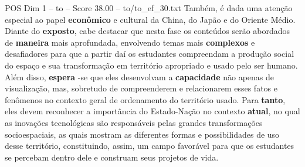 \begin{textsample}{POS Dim 1 – to – Score 38.00 – to/to\_ef\_30.txt}
Também, é dada uma atenção especial ao papel \textbf{econômico} e cultural da China, do Japão e do Oriente Médio.
Diante do \textbf{exposto}, cabe destacar que nesta fase os conteúdos serão abordados de \textbf{maneira} mais aprofundada, envolvendo temas mais \textbf{complexos} e desafiadores para que a partir daí os estudantes compreendam a produção social do espaço e sua transformação em território apropriado e usado pelo ser humano.
Além disso, \textbf{espera} -se que eles desenvolvam a \textbf{capacidade} não apenas de visualização, mas, sobretudo de compreenderem e relacionarem esses fatos e fenômenos no contexto geral de ordenamento do território usado.
Para \textbf{tanto}, eles devem reconhecer a importância do Estado-Nação no contexto \textbf{atual}, no qual as inovações tecnológicas são responsáveis pelas grandes transformações socioespaciais, as quais mostram as diferentes formas e possibilidades de uso desse território, constituindo, assim, um campo favorável para que os estudantes se percebam dentro dele e construam seus projetos de vida.

\end{textsample}
